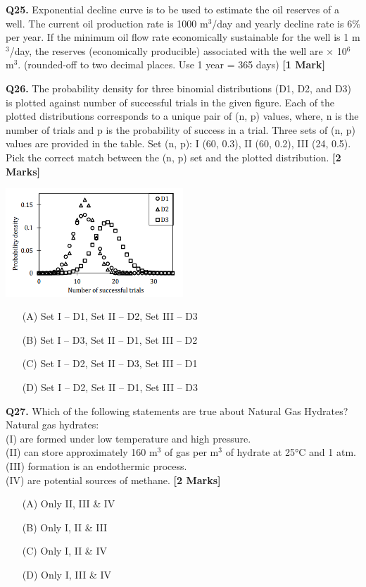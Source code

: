 \documentclass[11pt]{article}
\newcommand{\questiona}[2]{
    \noindent\textbf{Q#2.} #1 \hfill \textbf{[1 Mark]}
}
\newcommand{\questionb}[2]{
    \noindent\textbf{Q#2.} #1 \hfill \textbf{[2 Marks]}
}
\begin{document}
\questiona{Exponential decline curve is to be used to estimate the oil reserves of a well. The current oil production rate is 1000 m\(^3\)/day and yearly decline rate is 6\% per year. If the minimum oil flow rate economically sustainable for the well is 1 m\(^3\)/day, the reserves (economically producible) associated with the well are \underline{\hspace{3cm}} × 10\(^6\) m\(^3\). (rounded-off to two decimal places. Use 1 year = 365 days)}{25}
\vspace{0.5cm}

\questionb{The probability density for three binomial distributions (D1, D2, and D3) is plotted against number of successful trials in the given figure. Each of the plotted distributions corresponds to a unique pair of (n, p) values, where, n is the number of trials and p is the probability of success in a trial. Three sets of (n, p) values are provided in the table. Set (n, p): I (60, 0.3), II (60, 0.2), III (24, 0.5). Pick the correct match between the (n, p) set and the plotted distribution.}{26}
\begin{center}
\includegraphics[width=0.5\textwidth]{figures/26.png}
\end{center}
\begin{enumerate}
    \item[(A)] Set I – D1, Set II – D2, Set III – D3  
    \item[(B)] Set I – D3, Set II – D1, Set III – D2  
    \item[(C)] Set I – D2, Set II – D3, Set III – D1  
    \item[(D)] Set I – D2, Set II – D1, Set III – D3  
\end{enumerate}
\vspace{0.5cm}

\questionb{Which of the following statements are true about Natural Gas Hydrates? \\
Natural gas hydrates: \\
(I) are formed under low temperature and high pressure. \\
(II) can store approximately 160 m\(^3\) of gas per m\(^3\) of hydrate at 25°C and 1 atm. \\
(III) formation is an endothermic process. \\
(IV) are potential sources of methane.}{27}
\begin{enumerate}
    \item[(A)] Only II, III \& IV  
    \item[(B)] Only I, II \& III  
    \item[(C)] Only I, II \& IV  
    \item[(D)] Only I, III \& IV  
\end{enumerate}
\vspace{0.5cm}
\end{document}
